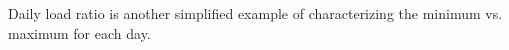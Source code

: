 Daily load ratio is another simplified example of characterizing the minimum vs. maximum for each day.